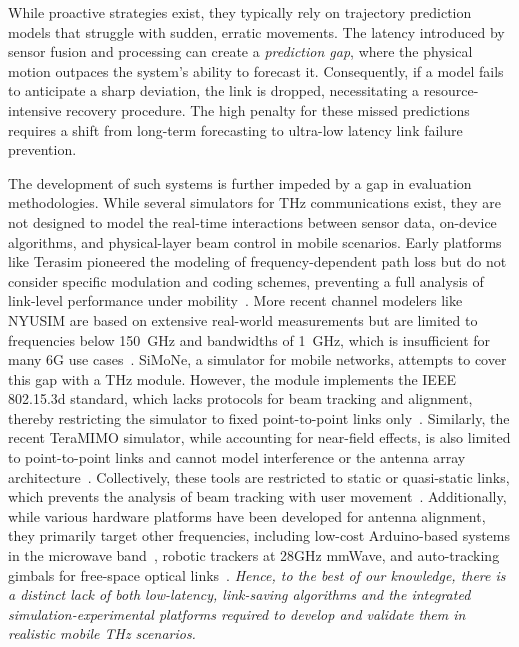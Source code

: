\documentclass[fleqn,10pt]{wlscirep}
\begin{document}
While proactive strategies exist, they typically rely on trajectory prediction models that struggle with sudden, erratic movements. The latency introduced by sensor fusion and processing can create a \emph{prediction gap}, where the physical motion outpaces the system's ability to forecast it\cite{9838772, 10036372}. Consequently, if a model fails to anticipate a sharp deviation, the link is dropped, necessitating a resource-intensive recovery procedure. The high penalty for these missed predictions requires a shift from long-term forecasting to ultra-low latency link failure prevention.

The development of such systems is further impeded by a gap in evaluation methodologies. While several simulators for THz communications exist, they are not designed to model the real-time interactions between sensor data, on-device algorithms, and physical-layer beam control in mobile scenarios. Early platforms like Terasim pioneered the modeling of frequency-dependent path loss but do not consider specific modulation and coding schemes, preventing a full analysis of link-level performance under mobility~\cite{HOSSAIN2019100004, eckhardt2022modular}. More recent channel modelers like NYUSIM are based on extensive real-world measurements but are limited to frequencies below 150~GHz and bandwidths of 1~GHz, which is insufficient for many 6G use cases~\cite{10367974}. SiMoNe, a simulator for mobile networks, attempts to cover this gap with a THz module. However, the module implements the IEEE 802.15.3d standard, which lacks protocols for beam tracking and alignment, thereby restricting the simulator to fixed point-to-point links only~\cite{rose2015simone, eckhardt2022modular}. Similarly, the recent TeraMIMO simulator, while accounting for near-field effects, is also limited to point-to-point links and cannot model interference or the antenna array architecture~\cite{tarboush2021teramimo, bodet2023directional}. Collectively, these tools are restricted to static or quasi-static links, which prevents the analysis of beam tracking with user movement~\cite{Petrov2023Mobile}. Additionally, while various hardware platforms have been developed for antenna alignment, they primarily target other frequencies, including low-cost Arduino-based systems in the microwave band~\cite{Abdulwahab2020}, robotic trackers at 28GHz mmWave\cite{Keshavamurthy2022}, and auto-tracking gimbals for free-space optical links~\cite{AlAkkoumi2008}. \emph{Hence, to the best of our knowledge, there is a distinct lack of both low-latency, link-saving algorithms and the integrated simulation-experimental platforms required to develop and validate them in realistic mobile THz scenarios.}
\end{document}
